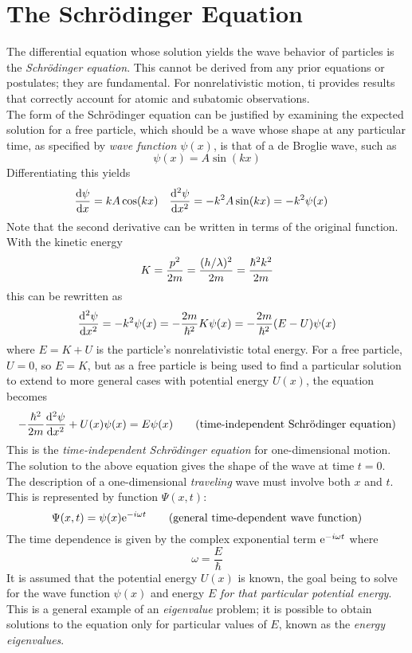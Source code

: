 \documentclass{subfiles}
\begin{document}
	\section{The Schr\"odinger Equation}
		The differential equation whose solution yields the wave behavior of particles is the \textit{Schr\"odinger equation}. This cannot be derived from any prior equations or postulates; they are fundamental. For nonrelativistic motion, ti provides results that correctly account for atomic and subatomic observations. \\
		The form of the Schr\"odinger equation can be justified by examining the expected solution for a free particle, which should be a wave whose shape at any particular time, as specified by \textit{wave function \(\psi(x)\)}, is that of a de Broglie wave, such as
			\[\psi(x) = A\sin(kx)\]
			Differentiating this yields
			\begin{align*}
				\dv{\psi}{x} &= kA\cos(kx) &
					\dv[2]{\psi}{x} &= -k^2A\sin(kx)
						= -k^2\psi(x)
			\end{align*}
			Note that the second derivative can be written in terms of the original function. With the kinetic energy
			\[
				K = \frac{p^2}{2m} \\
					= \frac{(h/\lambda)^2}{2m}
					= \frac{\hbar^2k^2}{2m}	
			\]
			this can be rewritten as
			\[
				\dv[2]{\psi}{x}
					= -k^2\psi(x)
					= -\frac{2m}{\hbar^2}K\psi(x)
					= -\frac{2m}{\hbar^2}(E - U)\psi(x)
			\]
			where \(E = K + U\) is the particle's nonrelativistic total energy. For a free particle, \(U = 0\), so \(E = K\), but as a free particle is being used to find a particular solution to extend to more general cases with potential energy \(U(x)\), the equation becomes
			\[-\frac{\hbar^2}{2m}\dv[2]{\psi}{x} + U(x)\psi(x) = E\psi(x) \tag{time-independent Schr\"odinger equation}\]
			This is the \textit{time-independent Schr\"odinger equation} for one-dimensional motion. \\
		The solution to the above equation gives the shape of the wave at time \(t = 0\). The description of a one-dimensional \textit{traveling} wave must involve both \(x\) and \(t\). This is represented by function \(\Psi(x, t)\):
			\[\Psi(x, t) = \psi(x)\text{e}^{-i\omega t} \tag{general time-dependent wave function}\]
			The time dependence is given by the complex exponential term \(\text{e}^{-i\omega t}\) where
			\[\omega = \frac{E}{\hbar}\]
		It is assumed that the potential energy \(U(x)\) is known, the goal being to solve for the wave function \(\psi(x)\) and energy \(E\) \textit{for that particular potential energy}. This is a general example of an \textit{eigenvalue} problem; it is possible to obtain solutions to the equation only for particular values of \(E\), known as the \textit{energy eigenvalues}. \\
\end{document}
